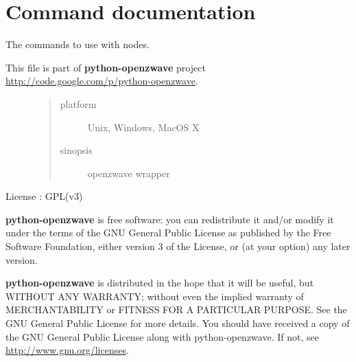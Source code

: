 \documentclass[letterpaper,10pt,english]{sphinxmanual}
\begin{document}
\section{Command documentation}
\label{command::doc}\label{command:command-documentation}
The commands to use with nodes.
\label{command:module-openzwave.command}\label{command:module-openzwave.command}\begin{description}
\item[{This file is part of \textbf{python-openzwave} project \href{http://code.google.com/p/python-openzwave}{http://code.google.com/p/python-openzwave}.}] \leavevmode\begin{quote}\begin{description}
\item[{platform}] \leavevmode
Unix, Windows, MacOS X

\item[{sinopsis}] \leavevmode
openzwave wrapper

\end{description}\end{quote}

\end{description}

License : GPL(v3)

\textbf{python-openzwave} is free software: you can redistribute it and/or modify
it under the terms of the GNU General Public License as published by
the Free Software Foundation, either version 3 of the License, or
(at your option) any later version.

\textbf{python-openzwave} is distributed in the hope that it will be useful,
but WITHOUT ANY WARRANTY; without even the implied warranty of
MERCHANTABILITY or FITNESS FOR A PARTICULAR PURPOSE. See the
GNU General Public License for more details.
You should have received a copy of the GNU General Public License
along with python-openzwave. If not, see \href{http://www.gnu.org/licenses}{http://www.gnu.org/licenses}.
\end{document}
